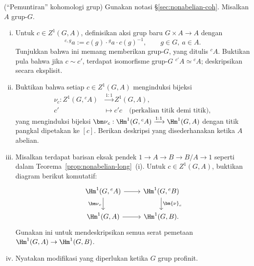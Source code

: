 \begin{Exercises}
	\item (``Pemuntiran'' kohomologi grup) Gunakan notasi
	\S\ref{sec:nonabelian-coh}. Misalkan $A$ grup-$G$.
	\begin{enumerate}[(i)]
		\item Untuk $c\in Z^1(G,A)$, definisikan aksi grup baru
		$G\times A\to A$ dengan
		\[ {}^{c,g}a:=c(g)\cdot{}^ga\cdot c(g)^{-1},
		\qquad g\in G,\ a\in A. \]
		Tunjukkan bahwa ini memang memberikan grup-$G$, yang ditulis ${}^cA$.
		Buktikan pula bahwa jika $c\sim c'$, terdapat isomorfisme grup-$G$
		${}^{c'}A\simeq{}^cA$; deskripsikan secara eksplisit.
		\item Buktikan bahwa setiap $c\in Z^1(G,A)$ menginduksi bijeksi
		\begin{align*}
			\nu_c:Z^1(G,{}^cA)&\xrightarrow{1:1}Z^1(G,A),\\
			c'&\longmapsto c'c\quad\text{(perkalian titik demi titik)},
		\end{align*}
		yang menginduksi bijeksi
		${\bm\nu}_c:\Hm^1(G,{}^cA)\xrightarrow{1:1}\Hm^1(G,A)$ dengan titik
		pangkal dipetakan ke $[c]$. Berikan deskripsi yang disederhanakan ketika
		$A$ abelian.
		\item Misalkan terdapat barisan eksak pendek
		$1\to A\to B\to B/A\to1$ seperti dalam
		Teorema~\ref{prop:nonabelian-long}~(i). Untuk $c\in Z^1(G,A)$,
		buktikan diagram berikut komutatif:
		\[\begin{tikzcd}
			\Hm^1(G,{}^cA) \arrow[r] \arrow[d,"{{\bm\nu}_c}"'] &
			\Hm^1(G,{}^cB) \arrow[d,"{\bm{\nu}_c}"]\\
			\Hm^1(G,A) \arrow[r] & \Hm^1(G,B).
		\end{tikzcd}\]
		Gunakan ini untuk mendeskripsikan semua serat pemetaan
		$\Hm^1(G,A)\to\Hm^1(G,B)$.
		\item Nyatakan modifikasi yang diperlukan ketika $G$ grup profinit.
	\end{enumerate}
\end{Exercises}

